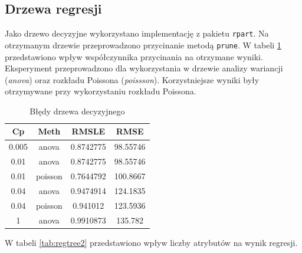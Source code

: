 \documentclass[a4paper,12pt]{article}
\begin{document}
   \subsection{Drzewa regresji}
       Jako drzewo decyzyjne wykorzystano implementację z pakietu \texttt{rpart}. Na otrzymanym drzewie przeprowadzono przycinanie metodą \texttt{prune}.
       W tabeli \ref{tab:regtree1} przedstawiono wpływ współczynnika przycinania na otrzymane wyniki. Eksperyment przeprowadzono dla wykorzystania w drzewie analizy wariancji (\textit{anova}) oraz rozkładu Poissona (\textit{poissson}). Korzystniejsze wyniki były otrzymywane przy wykorzystaniu rozkładu Poissona.
        \begin{table}
            \begin{tabular}{|c|c|c|c|}
                \hline
                Cp & Meth & RMSLE & RMSE \\
                \hline
                0.005 & anova & 0.8742775 & 98.55746 \\
                \hline
                0.01 & anova & 0.8742775 & 98.55746 \\
                \hline
                0.01 & poisson & 0.7644792 & 100.8667 \\
                \hline
                0.04 & anova & 0.9474914 & 124.1835 \\
                \hline
                0.04 & poisson & 0.941012 & 123.5936 \\
                \hline
                1 & anova & 0.9910873 & 135.782 \\
                \hline
            \end{tabular}
            \caption{Błędy drzewa decyzyjnego}
            \label{tab:regtree1}
        \end{table}
        
        W tabeli \ref{tab:regtree2} przedstawiono wpływ liczby atrybutów na wynik regresji.
        
\end{document}
